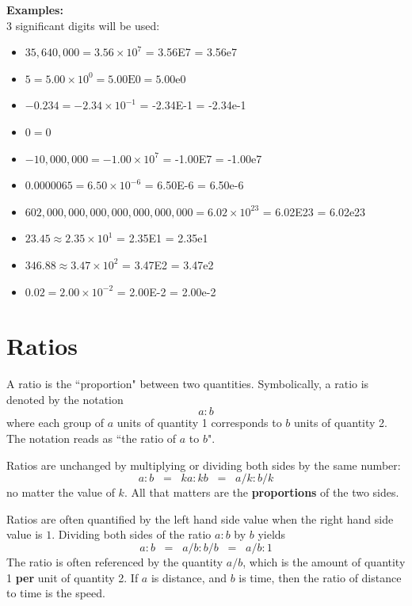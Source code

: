 \documentclass{article}
\begin{document}
\textbf{Examples:} \\
\(3\) significant digits will be used: 
\begin{itemize}
\item \(35,\!640,\!000 = 3.56 \times 10^7\) = 3.56E7 = 3.56e7
\item \(5 = 5.00 \times 10^0 = 5.00\text{E}0 = 5.00\text{e}0\)
\item \(-0.234 = -2.34 \times 10^{-1}\) = -2.34E-1 = -2.34e-1
\item \(0 = 0\)
\item \(-10,000,000 = -1.00 \times 10^7\) = -1.00E7 = -1.00e7
\item \(0.0000065 = 6.50 \times 10^{-6}\) = 6.50E-6 = 6.50e-6
\item \(602,000,000,000,000,000,000,000 = 6.02 \times 10^{23}\) = 6.02E23 = 6.02e23
\item \(23.45 \approx 2.35 \times 10^1\) = 2.35E1 = 2.35e1
\item \(346.88 \approx 3.47 \times 10^2\) = 3.47E2 = 3.47e2
\item \(0.02 = 2.00 \times 10^{-2}\) = 2.00E-2 = 2.00e-2
\end{itemize}




\section{Ratios}

A ratio is the ``proportion" between two quantities. Symbolically, a ratio is denoted by the notation 
\[a : b\]
where each group of \(a\) units of quantity 1 corresponds to \(b\) units of quantity 2. The notation reads as ``the ratio of \(a\) to \(b\)".

Ratios are unchanged by multiplying or dividing both sides by the same number:
\[a : b \;\;=\;\; ka : kb \;\;=\;\; a/k : b/k\]
no matter the value of \(k\). All that matters are the {\bf proportions} of the two sides.

Ratios are often quantified by the left hand side value when the right hand side value is \(1\). Dividing both sides of the ratio \(a : b\) by \(b\) yields 
\[a : b \;\;=\;\; a/b : b/b \;\;=\;\; a/b : 1\]
The ratio is often referenced by the quantity \(a/b\), which is the amount of quantity 1 {\bf per} unit of quantity 2. If \(a\) is distance, and \(b\) is time, then the ratio of distance to time is the speed.

\vspace{5mm}
\end{document}
